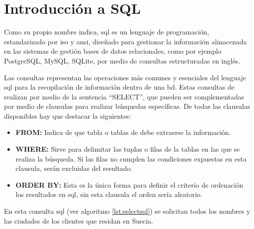 \section{Introducción a SQL}

Como su propio nombre indica, \acrfull{sql} es un lenguaje de programación, estandarizado por \acrshort{iso}\cite{ISO} y \acrshort{ansi}\cite{ANSI}, diseñado para gestionar la información almacenada en las sistemas de gestión bases de datos relacionales, como por ejemplo PostgreSQL\cite{PostgreSQL}, MySQL\cite{MySQL}, SQLite\cite{SQLite}, por medio de consultas estructuradas en inglés.

Las consultas representan las operaciones más comunes y esenciales del lenguaje \acrshort{sql} para la recopilación de información dentro de una \acrshort{bd}. Estas consultas de realizan por medio de la sentencia ``SELECT'', que pueden ser complementadas por medio de clausulas para realizar búsquedas específicas. De todas las clausulas disponibles hay que destacar la siguientes:

\begin{itemize}
	\item \textbf{FROM:} Indica de que tabla o tablas de debe extraerse la información.
	\item \textbf{WHERE:} Sirve para delimitar las tuplas o filas de la tablas en las que se realiza la búsqueda. Si las filas no cumplen las condiciones expuestas en esta clausula, serán excluidas del resultado.
	\item \textbf{ORDER BY:} Esta es la única forma para definir el criterio de ordenación los resultados en \acrshort{sql}, sin esta clausula el orden sería aleatorio.
\end{itemize}



En esta consulta \acrshort{sql} (ver algoritmo \ref{lst:selectsql}) se solicitan todos los nombres y las ciudades de los clientes que residan en Suecia.